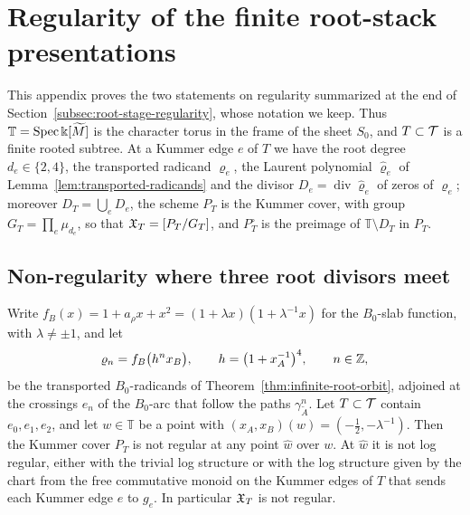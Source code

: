 \section{Regularity of the finite root-stack presentations}
\label{app:regular-presentation}

This appendix proves the two statements on regularity summarized at the end
of Section~\ref{subsec:root-stage-regularity}, whose notation we keep.  Thus
$\mathbb T=\operatorname{Spec}\Bbbk[\widetilde M]$ is the character torus in the frame of the
sheet $S_0$, and $T\subset\mathcal T$ is a finite rooted subtree.  At a Kummer edge
$e$ of $T$ we have the root degree $d_e\in\{2,4\}$, the transported radicand
$\varrho_e$, the Laurent polynomial $\widehat\varrho_e$ of
Lemma~\ref{lem:transported-radicands} and the divisor
$D_e=\operatorname{div}\widehat\varrho_e$ of zeros of $\varrho_e$; moreover
$D_T=\bigcup_eD_e$, the scheme $P_T$ is the Kummer cover, with
group $G_T=\prod_e\mu_{d_e}$, so that $\mathfrak X_T=[P_T/G_T]$, and $P_T^\circ$
is the preimage of $\mathbb T\setminus D_T$ in $P_T$.

\subsection{Non-regularity where three root divisors meet}

\begin{proposition}
\label{prop:root-stage-nonregular}
Write $f_B(x)=1+a_\rho x+x^2=(1+\lambda x)(1+\lambda^{-1}x)$ for the $B_0$-slab
function, with $\lambda\neq\pm1$, and let
\[
 \varrho_n=f_B\bigl(h^nx_B\bigr),\qquad h=\bigl(1+x_A^{-1}\bigr)^4,\qquad n\in\mathbb Z,
\]
be the transported $B_0$-radicands of Theorem~\ref{thm:infinite-root-orbit},
adjoined at the crossings $e_n$ of the $B_0$-arc that follow the paths
$\gamma_{\widetilde A}^n$.  Let $T\subset\mathcal T$ contain
$e_0,e_1,e_2$, and let $w\in\mathbb T$ be a point with
$(x_A,x_B)(w)=(-\tfrac12,-\lambda^{-1})$.  Then the Kummer cover $P_T$ is not
regular at any point $\hat w$ over $w$.  At $\hat w$ it is not log regular,
either with the trivial log structure or with the log structure given by
the chart from the free commutative monoid on the Kummer edges of $T$ that
sends each Kummer edge $e$ to $g_e$.  In particular $\mathfrak X_T$ is not regular.
\end{proposition}

